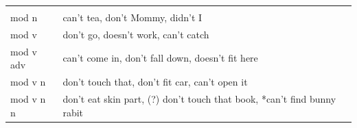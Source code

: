 \documentclass[man]{apa6}
\begin{document}
\begin{longtable}[]{@{}lll@{}}
\begin{minipage}[t]{0.27\columnwidth}
\strut
\end{minipage}\tabularnewline
\begin{minipage}[t]{0.21\columnwidth}\raggedright\strut
mod n\strut
\end{minipage} & \begin{minipage}[t]{0.43\columnwidth}\raggedright\strut
can't tea, don't Mommy, didn't I\strut
\end{minipage} & \begin{minipage}[t]{0.27\columnwidth}\raggedright\strut
\strut
\end{minipage}\tabularnewline
\begin{minipage}[t]{0.21\columnwidth}\raggedright\strut
mod v\strut
\end{minipage} & \begin{minipage}[t]{0.43\columnwidth}\raggedright\strut
don't go, doesn't work, can't catch\strut
\end{minipage} & \begin{minipage}[t]{0.27\columnwidth}\raggedright\strut
\strut
\end{minipage}\tabularnewline
\begin{minipage}[t]{0.21\columnwidth}\raggedright\strut
mod v adv\strut
\end{minipage} & \begin{minipage}[t]{0.43\columnwidth}\raggedright\strut
can't come in, don't fall down, doesn't fit here\strut
\end{minipage} & \begin{minipage}[t]{0.27\columnwidth}\raggedright\strut
\strut
\end{minipage}\tabularnewline
\begin{minipage}[t]{0.21\columnwidth}\raggedright\strut
mod v n\strut
\end{minipage} & \begin{minipage}[t]{0.43\columnwidth}\raggedright\strut
don't touch that, don't fit car, can't open it\strut
\end{minipage} & \begin{minipage}[t]{0.27\columnwidth}\raggedright\strut
\strut
\end{minipage}\tabularnewline
\begin{minipage}[t]{0.21\columnwidth}\raggedright\strut
mod v n n\strut
\end{minipage} & \begin{minipage}[t]{0.43\columnwidth}\raggedright\strut
don't eat skin part, (?) don't touch that book, *can't find bunny
rabit\strut
\end{minipage} & \begin{minipage}[t]{0.27\columnwidth}\raggedright\strut

\end{minipage}
\end{longtable}
\end{document}
